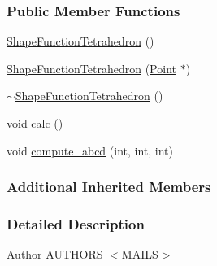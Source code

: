 \subsubsection*{Public Member Functions}
\begin{DoxyCompactItemize}
\item 
\hyperlink{classmknix_1_1_shape_function_tetrahedron_a470f6ba9b843785e1bd412f66830f201}{Shape\-Function\-Tetrahedron} ()
\item 
\hyperlink{classmknix_1_1_shape_function_tetrahedron_a0bbef63fdeaff7a06c33b29f0132c991}{Shape\-Function\-Tetrahedron} (\hyperlink{classmknix_1_1_point}{Point} $\ast$)
\item 
\hyperlink{classmknix_1_1_shape_function_tetrahedron_acd13333d97502dc1ab76178452beef76}{$\sim$\-Shape\-Function\-Tetrahedron} ()
\item 
void \hyperlink{classmknix_1_1_shape_function_tetrahedron_a9b09613d74f957f733a03bec83557850}{calc} ()
\item 
void \hyperlink{classmknix_1_1_shape_function_tetrahedron_a0173ff8fc55470c6d46684cd28eeb345}{compute\-\_\-abcd} (int, int, int)
\end{DoxyCompactItemize}
\subsubsection*{Additional Inherited Members}


\subsubsection{Detailed Description}
\begin{DoxyAuthor}{Author}
A\-U\-T\-H\-O\-R\-S $<$\-M\-A\-I\-L\-S$>$ 
\end{DoxyAuthor}


